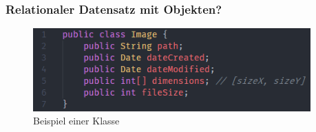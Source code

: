 \begin{frame}
    \frametitle{Relationaler Datensatz mit Objekten?}
    \begin{figure}
        \begin{small}
            \begin{center}
                \includegraphics[width=0.95\textwidth]{img/ClassExample.png}
            \end{center}
            \caption{Beispiel einer  Klasse}
            \label{fig:image}
        \end{small}
    \end{figure}
\end{frame}

